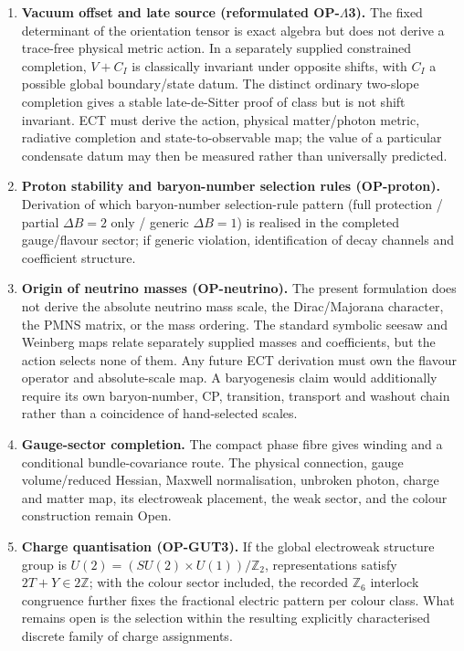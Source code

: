 \documentclass[11pt,a4paper]{article}
\begin{document}
\begin{enumerate}
\item \textbf{Vacuum offset and late source (reformulated
OP-$\Lambda$3).}  The fixed determinant of the orientation tensor is exact
algebra but does not derive a trace-free physical metric action.  In a
separately supplied constrained completion, $V+C_I$ is classically invariant
under opposite shifts, with $C_I$ a possible global boundary/state datum.
The distinct ordinary two-slope completion gives a stable late-de-Sitter
proof of class but is not shift invariant.  ECT must derive the action,
physical matter/photon metric, radiative completion and state-to-observable
map; the value of a particular condensate datum may then be measured rather
than universally predicted.

\item \textbf{Proton stability and baryon-number selection rules (OP-proton).} Derivation of which baryon-number selection-rule pattern (full protection / partial $\Delta B\!=\!2$ only / generic $\Delta B\!=\!1$) is realised in the completed gauge/flavour sector; if generic violation, identification of decay channels and coefficient structure.

\item \textbf{Origin of neutrino masses (OP-neutrino).} The present formulation does not derive the absolute neutrino mass scale, the Dirac/Majorana character, the PMNS matrix, or the mass ordering.  The standard symbolic seesaw and Weinberg maps relate separately supplied masses and coefficients, but the action selects none of them.  Any future ECT derivation must own the flavour operator and absolute-scale map.  A baryogenesis claim would additionally require its own baryon-number, CP, transition, transport and washout chain rather than a coincidence of hand-selected scales.

\item \textbf{Gauge-sector completion.} The compact phase fibre gives winding and a conditional bundle-covariance route.  The physical connection, gauge volume/reduced Hessian, Maxwell normalisation, unbroken photon, charge and matter map, its electroweak placement, the weak sector, and the colour construction remain Open.

\item \textbf{Charge quantisation (OP-GUT3).} If the global electroweak structure group is $U(2) = (SU(2) \times U(1))/\mathbb{Z}_2$, representations satisfy $2T + Y \in 2\mathbb{Z}$; with the colour sector included, the recorded $\mathbb{Z}_6$ interlock congruence further fixes the fractional electric pattern per colour class. What remains open is the selection within the resulting explicitly characterised discrete family of charge assignments.


\end{enumerate}
\end{document}
